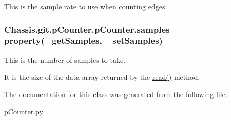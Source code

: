 This is the sample rate to use when counting edges. 

\hypertarget{class_chassis_8git_1_1p_counter_1_1p_counter_acfa466a92fa7a706ba68493e1ff59441}{
\subsubsection[{samples}]{\setlength{\rightskip}{0pt plus 5cm}Chassis.\-git.\-p\-Counter.\-p\-Counter.\-samples property(\-\_\-get\-Samples, \-\_\-set\-Samples)\hspace{0.3cm}{\ttfamily [static]}}}\label{class_chassis_8git_1_1p_counter_1_1p_counter_acfa466a92fa7a706ba68493e1ff59441}


This is the number of samples to take. 

It is the size of the data array returned by the \hyperlink{class_chassis_8git_1_1p_counter_1_1p_counter_aa462351619f5172f6ac669b4a1ba84d3}{read()} method. 

The documentation for this class was generated from the following file\-:\begin{DoxyCompactItemize}
\item 
p\-Counter.\-py\end{DoxyCompactItemize}
